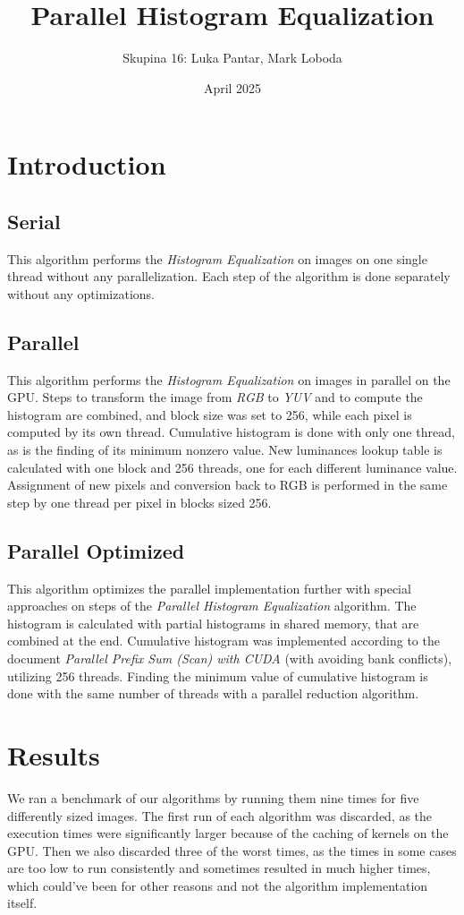 \documentclass{article}
\title{Parallel Histogram Equalization}
\author{Skupina 16: Luka Pantar, Mark Loboda}
\date{April 2025}
\begin{document}
\maketitle

\section{Introduction}
\subsection{Serial}
This algorithm performs the \textit{Histogram Equalization} on images on one single thread without any parallelization. Each step of the algorithm is done separately without any optimizations.

\subsection{Parallel}
This algorithm performs the \textit{Histogram Equalization} on images in parallel on the GPU. Steps to transform the image from \textit{RGB} to \textit{YUV} and to compute the histogram are combined, and block size was set to 256, while each pixel is computed by its own thread. Cumulative histogram is done with only one thread, as is the finding of its minimum nonzero value. New luminances lookup table is calculated with one block and 256 threads, one for each different luminance value. Assignment of new pixels and conversion back to RGB is performed in the same step by one thread per pixel in blocks sized 256.

\subsection{Parallel Optimized}
This algorithm optimizes the parallel implementation further with special approaches on steps of the \textit{Parallel Histogram Equalization} algorithm. The histogram is calculated with partial histograms in shared memory, that are combined at the end. Cumulative histogram was implemented according to the document \textit{Parallel Prefix Sum
(Scan) with CUDA} (with avoiding bank conflicts), utilizing 256 threads. Finding the minimum value of cumulative histogram is done with the same number of threads with a parallel reduction algorithm.

\section{Results}
We ran a benchmark of our algorithms by running them nine times for five differently sized images. The first run of each algorithm was discarded, as the execution times were significantly larger because of the caching of kernels on the GPU. Then we also discarded three of the worst times, as the times in some cases are too low to run consistently and sometimes resulted in much higher times, which could've been for other reasons and not the algorithm implementation itself.
\end{document}
